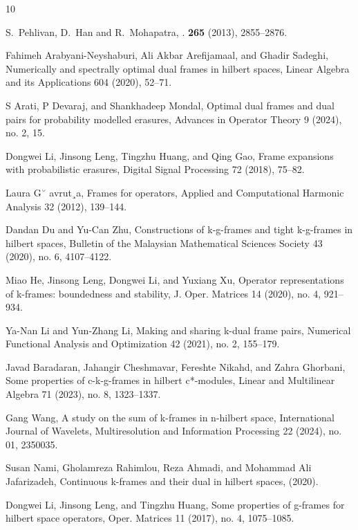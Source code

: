 \documentclass[final,1p,times]{elsarticle}
\begin{document}

\begin{thebibliography}{10}

	
S.~Pehlivan, D.~Han and R.~Mohapatra,
.
 \textbf{265} (2013), 2855--2876.

Fahimeh Arabyani-Neyshaburi, Ali Akbar Arefijamaal, and Ghadir Sadeghi, Numerically and spectrally optimal
dual frames in hilbert spaces, Linear Algebra and its Applications 604 (2020), 52–71.

S Arati, P Devaraj, and Shankhadeep Mondal, Optimal dual frames and dual pairs for probability modelled
erasures, Advances in Operator Theory 9 (2024), no. 2, 15.

Dongwei Li, Jinsong Leng, Tingzhu Huang, and Qing Gao, Frame expansions with probabilistic erasures, Digital
Signal Processing 72 (2018), 75–82.

Laura G˘ avrut¸a, Frames for operators, Applied and Computational Harmonic Analysis 32 (2012), 139–144.

 Dandan Du and Yu-Can Zhu, Constructions of k-g-frames and tight k-g-frames in hilbert spaces, Bulletin of the
Malaysian Mathematical Sciences Society 43 (2020), no. 6, 4107–4122.

Miao He, Jinsong Leng, Dongwei Li, and Yuxiang Xu, Operator representations of k-frames: boundedness and
stability, J. Oper. Matrices 14 (2020), no. 4, 921–934.

 Ya-Nan Li and Yun-Zhang Li, Making and sharing k-dual frame pairs, Numerical Functional Analysis and
Optimization 42 (2021), no. 2, 155–179.

 Javad Baradaran, Jahangir Cheshmavar, Fereshte Nikahd, and Zahra Ghorbani, Some properties of c-k-g-frames in
hilbert c*-modules, Linear and Multilinear Algebra 71 (2023), no. 8, 1323–1337.

 Gang Wang, A study on the sum of k-frames in n-hilbert space, International Journal of Wavelets, Multiresolution
and Information Processing 22 (2024), no. 01, 2350035.

Susan Nami, Gholamreza Rahimlou, Reza Ahmadi, and Mohammad Ali Jafarizadeh, Continuous k-frames and
their dual in hilbert spaces, (2020).


Dongwei Li, Jinsong Leng, and Tingzhu Huang, Some properties of g-frames for hilbert space operators, Oper.
Matrices 11 (2017), no. 4, 1075–1085.



\end{thebibliography}
\end{document}

